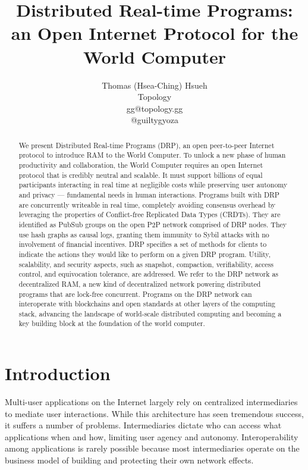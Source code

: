 \documentclass{article}
\title{Distributed Real-time Programs: an Open Internet Protocol for the World Computer}
\author{
 Thomas (Hsea-Ching) Hsueh \\
 Topology \\
 gg@topology.gg \\
 @guiltygyoza
}
\begin{document}
\maketitle


\begin{abstract}
We present Distributed Real-time Programs (DRP), an open peer-to-peer Internet protocol to introduce RAM to the World Computer. To unlock a new phase of human productivity and collaboration, the World Computer requires an open Internet protocol that is credibly neutral and scalable. It must support billions of equal participants interacting in real time at negligible costs while preserving user autonomy and privacy — fundamental needs in human interactions. Programs built with DRP are concurrently writeable in real time, completely avoiding consensus overhead by leveraging the properties of Conflict-free Replicated Data Types (CRDTs). They are identified as PubSub groups on the open P2P network comprised of DRP nodes. They use hash graphs as causal logs, granting them immunity to Sybil attacks with no involvement of financial incentives. DRP specifies a set of methods for clients to indicate the actions they would like to perform on a given DRP program. Utility, scalability, and security aspects, such as snapshot, compaction, verifiability, access control, and equivocation tolerance, are addressed. We refer to the DRP network as decentralized RAM, a new kind of decentralized network powering distributed programs that are lock-free concurrent. Programs on the DRP network can interoperate with blockchains and open standards at other layers of the computing stack, advancing the landscape of world-scale distributed computing and becoming a key building block at the foundation of the world computer.
\end{abstract}



\section{Introduction}
Multi-user applications on the Internet largely rely on centralized intermediaries to mediate user interactions. While this architecture has seen tremendous success, it suffers a number of problems. Intermediaries dictate who can access what applications when and how, limiting user agency and autonomy. Interoperability among applications is rarely possible because most intermediaries operate on the business model of building and protecting their own network effects.
\end{document}
